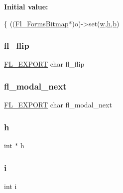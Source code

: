 {\bfseries Initial value\+:}
\begin{DoxyCode}
\{
    ((\hyperlink{class_fl___forms_bitmap}{Fl\_FormsBitmap}*)o)->set(\hyperlink{forms_8_h_aac374e320caaadeca4874add33b62af2}{w},\hyperlink{forms_8_h_a7e427ba5b307f9068129699250690066}{h},\hyperlink{forms_8_h_a0ba06a290a384fa06b1b90745827dae2}{b})
\end{DoxyCode}
\mbox{\label{forms_8_h_a009d493752306f784ef169df712f0461}} 
\subsubsection{\texorpdfstring{fl\+\_\+flip}{fl\_flip}}
{\footnotesize\ttfamily \hyperlink{_fl___export_8_h_aa9ba29a18aee9d738370a06eeb4470fc}{F\+L\+\_\+\+E\+X\+P\+O\+RT} char fl\+\_\+flip}

\mbox{\label{forms_8_h_a0ef577a96426e2b96298d1f2bb1cd1f5}} 
\subsubsection{\texorpdfstring{fl\+\_\+modal\+\_\+next}{fl\_modal\_next}}
{\footnotesize\ttfamily \hyperlink{_fl___export_8_h_aa9ba29a18aee9d738370a06eeb4470fc}{F\+L\+\_\+\+E\+X\+P\+O\+RT} char fl\+\_\+modal\+\_\+next}

\mbox{\label{forms_8_h_a7e427ba5b307f9068129699250690066}} 
\subsubsection{\texorpdfstring{h}{h}}
{\footnotesize\ttfamily int $\ast$ h}

\mbox{\label{forms_8_h_acb559820d9ca11295b4500f179ef6392}} 
\subsubsection{\texorpdfstring{i}{i}}
{\footnotesize\ttfamily int i}

